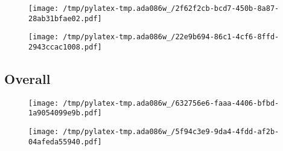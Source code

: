 \documentclass{article}%
\begin{document}
\begin{figure}[htbp]%
\centering%
\texttt{[image: /tmp/pylatex-tmp.ada086w\_/2f62f2cb-bcd7-450b-8a87-28ab31bfae02.pdf]}%
\end{figure}

%


\begin{figure}[htbp]%
\centering%
\texttt{[image: /tmp/pylatex-tmp.ada086w\_/22e9b694-86c1-4cf6-8ffd-2943ccac1008.pdf]}%
\end{figure}

%
\newpage %
\subsection{Overall}%
\label{subsec:Overall}%


\begin{figure}[htbp]%
\centering%
\texttt{[image: /tmp/pylatex-tmp.ada086w\_/632756e6-faaa-4406-bfbd-1a9054099e9b.pdf]}%
\end{figure}

%


\begin{figure}[htbp]%
\centering%
\texttt{[image: /tmp/pylatex-tmp.ada086w\_/5f94c3e9-9da4-4fdd-af2b-04afeda55940.pdf]}%
\end{figure}

%
\end{document}
